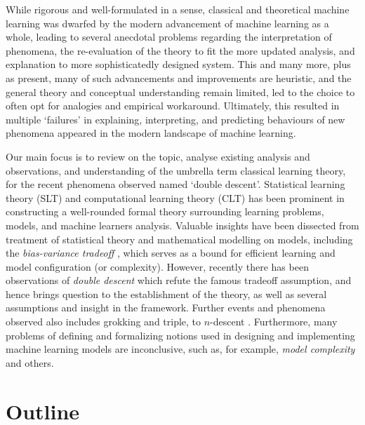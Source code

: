 \documentclass[10pt]{article} %
\begin{document}
While rigorous and well-formulated in a sense, classical and theoretical machine learning was dwarfed by the modern advancement of machine learning as a whole, leading to several anecdotal problems regarding the interpretation of phenomena, the re-evaluation of the theory to fit the more updated analysis, and explanation to more sophisticatedly designed system. This and many more, plus as present, many of such advancements and improvements are heuristic, and the general theory and conceptual understanding remain limited, led to the choice to often opt for analogies and empirical workaround. Ultimately, this resulted in multiple `failures' in explaining, interpreting, and predicting behaviours of new phenomena appeared in the modern landscape of machine learning.

Our main focus is to review on the topic, analyse existing analysis and observations, and understanding of the umbrella term classical learning theory, for the recent phenomena observed named `double descent'. Statistical learning theory (SLT) and computational learning theory (CLT) \cite{Vapnik1999-VAPTNO,10.5555/2371238,10.5555/2621980,STL_Hajek_Maxim_2021,bousquet2020theoryuniversallearning} has been prominent in constructing a well-rounded formal theory surrounding learning problems, models, and machine learners analysis. Valuable insights have been dissected from treatment of statistical theory and mathematical modelling on models, including the \textit{bias-variance tradeoff} \cite{6797087,Domingos2000AUB}, which serves as a bound for efficient learning and model configuration (or complexity). However, recently there has been observations of \textit{double descent} \cite{belkin_reconciling_2019,schaeffer_double_2023,nakkiran_deep_2019,lafon_understanding_2024} which refute the famous tradeoff assumption, and hence brings question to the establishment of the theory, as well as several assumptions and insight in the framework. Further events and phenomena observed also includes grokking and triple, to $n$-descent \cite{davies_unifying_2023,d_ascoli_triple_2020}. Furthermore, many problems of defining and formalizing notions used in designing and implementing machine learning models are inconclusive, such as, for example, \textit{model complexity} and others. 

\section{Outline}
\end{document}
